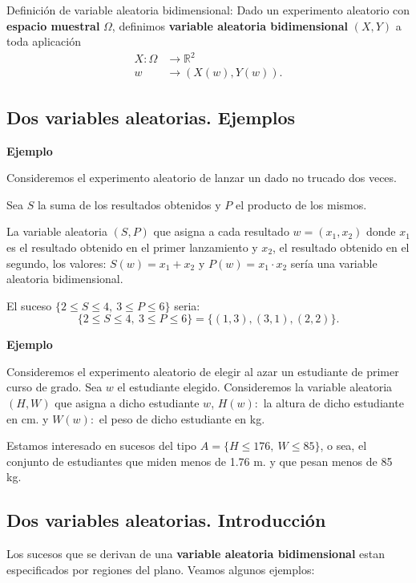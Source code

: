 \documentclass[]{book}
\begin{document}
Definición de variable aleatoria bidimensional:
Dado un experimento aleatorio con \textbf{espacio muestral} \(\Omega\), definimos \textbf{variable aleatoria bidimensional} \((X,Y)\) a toda aplicación
\[
\begin{array}{rl}
X: \Omega & \longrightarrow \mathbb{R}^2\\
w & \longrightarrow (X(w),Y(w)).
\end{array}
\]

\hypertarget{dos-variables-aleatorias.-ejemplos}{%
\subsection{Dos variables aleatorias. Ejemplos}\label{dos-variables-aleatorias.-ejemplos}}

\textbf{Ejemplo}

Consideremos el experimento aleatorio de lanzar un dado no trucado dos veces.

Sea \(S\) la suma de los resultados obtenidos y \(P\) el producto de los mismos.

La variable aleatoria \((S,P)\) que asigna a cada resultado \(w=(x_1,x_2)\) donde \(x_1\) es el resultado obtenido en el primer lanzamiento y \(x_2\), el resultado obtenido en el segundo, los valores: \(S(w)=x_1+x_2\) y \(P(w)=x_1\cdot x_2\) sería una variable aleatoria bidimensional.

El suceso \(\{2\leq S\leq 4,\ 3\leq P\leq 6\}\) seria:
\[
\{2\leq S\leq 4,\ 3\leq P\leq 6\} = \{(1,3),(3,1),(2,2)\}.
\]

\textbf{Ejemplo}

Consideremos el experimento aleatorio de elegir al azar un estudiante de primer curso de grado. Sea \(w\) el estudiante elegido. Consideremos la variable aleatoria \((H,W)\) que asigna a dicho estudiante \(w\), \(H(w):\) la altura de dicho estudiante en cm. y \(W(w):\) el peso de dicho estudiante en kg.

Estamos interesado en sucesos del tipo \(A=\{H\leq 176,\ W\leq 85\}\), o sea, el conjunto de estudiantes que miden menos de 1.76 m. y que pesan menos de 85 kg.

\hypertarget{dos-variables-aleatorias.-introducciuxf3n}{%
\subsection{Dos variables aleatorias. Introducción}\label{dos-variables-aleatorias.-introducciuxf3n}}

Los sucesos que se derivan de una \textbf{variable aleatoria bidimensional} estan especificados por regiones del plano.
Veamos algunos ejemplos:
\end{document}
